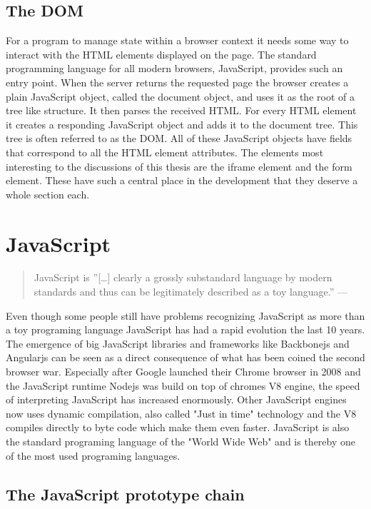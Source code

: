 \documentclass[english]{ifimaster}
\begin{document}
\subsection{The DOM}
For a program to manage state within a browser context it needs some way to interact with the HTML elements displayed on the page. The standard programming language for all modern browsers, JavaScript, provides such an entry point. When the server returns the requested page the browser creates a plain JavaScript object, called the document object, and uses it as the root of a tree like structure. It then parses the received HTML. For every HTML element it creates a responding JavaScript object and adds it to the document tree. This tree is often referred to as the DOM. All of these JavaScript objects have fields that correspond to all the HTML element attributes. The elements most interesting to the discussions of this thesis are the iframe element and the form element. These have such a central place in the development that they deserve a whole section each.


\section{JavaScript}
\begin{quotation}
\noindent JavaScript is ”[…] clearly a grossly substandard language by modern
standards and thus can be legitimately described as a toy language.” —
\parencite{arno}
\end{quotation}

Even though some people still have problems recognizing JavaScript as more than a toy programing language JavaScript has had a rapid evolution the last 10 years. The emergence of  big JavaScript libraries and frameworks like Backbonejs and Angularjs can be seen as a direct consequence of what has been coined the second browser war\parencite{Yule2013}. Especially after Google launched their Chrome browser in 2008 and the JavaScript runtime Nodejs was build on top of chromes V8 engine, the speed of interpreting JavaScript has increased enormously. Other JavaScript engines now uses dynamic compilation, also called "Just in time" technology and the V8 compiles directly to byte code which make them even faster\parencite{anand}. JavaScript is also the standard programing language of the "World Wide Web"\parencite[p. 1]{flanagan} and is thereby one of the most used programing languages.

\subsection{The JavaScript prototype chain}
\end{document}
